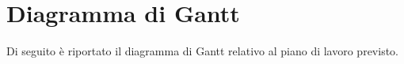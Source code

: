 \section*{Diagramma di Gantt}
Di seguito è riportato il diagramma di Gantt relativo al piano di lavoro previsto.
\begin{center}
\end{center}